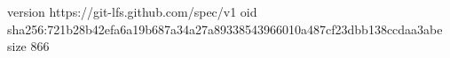 version https://git-lfs.github.com/spec/v1
oid sha256:721b28b42efa6a19b687a34a27a89338543966010a487cf23dbb138ccdaa3abe
size 866
